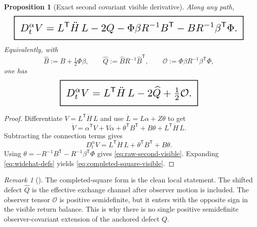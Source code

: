\documentclass[11pt,a4paper]{article}
\numberwithin{equation}{section}
\newcommand{\geomboxed}[1]{%
  \setlength{\fboxsep}{8pt}%
  \setlength{\fboxrule}{0.9pt}%
  \fbox{\scalebox{1.5}{$\displaystyle #1$}}%
}
\theoremstyle{thmcompact}
\newtheorem{proposition}[theorem]{Proposition}
\theoremstyle{remark}
\newtheorem*{remarkplain}{Remark}
\newenvironment{remark}[1][]%
{\begin{remarkbox}\begin{remarkplain}[#1]\normalfont}
{\end{remarkplain}\end{remarkbox}}
\begin{document}
\begin{proposition}[Exact second covariant visible derivative]
\label{prop:exact-second-visible}
Along any path,
\begin{equation}
\geomboxed{
D_t^\alpha V
=
L^{\mathsf T}\ddot H\,L
-
2Q
-
\Phi\beta R^{-1}B^{\mathsf T}
-
BR^{-1}\beta^{\mathsf T}\Phi.
}
\label{eq:raw-second-visible}
\end{equation}
Equivalently, with
\begin{equation}
\widehat B:=B+\tfrac12\Phi\beta,
\qquad
\widehat Q:=\widehat B R^{-1}\widehat B^{\mathsf T},
\qquad
\mathcal O:=\Phi\beta R^{-1}\beta^{\mathsf T}\Phi,
\label{eq:widehat-defs}
\end{equation}
one has
\begin{equation}
\geomboxed{
D_t^\alpha V
=
L^{\mathsf T}\ddot H\,L
-
2\widehat Q
+
\tfrac12\mathcal O.
}
\label{eq:completed-square-visible}
\end{equation}
\end{proposition}

\begin{proof}
Differentiate $V=L^{\mathsf T}\dot H\,L$ and use $\dot L=L\alpha+Z\theta$ to get
\[
\dot V=\alpha^{\mathsf T}V+V\alpha+\theta^{\mathsf T}B^{\mathsf T}+B\theta+L^{\mathsf T}\ddot H\,L.
\]
Subtracting the connection terms gives
\[
D_t^\alpha V=L^{\mathsf T}\ddot H\,L+\theta^{\mathsf T}B^{\mathsf T}+B\theta.
\]
Using $\theta=-R^{-1}B^{\mathsf T}-R^{-1}\beta^{\mathsf T}\Phi$ gives \eqref{eq:raw-second-visible}. Expanding \eqref{eq:widehat-defs} yields \eqref{eq:completed-square-visible}.
\end{proof}

\begin{remark}
The completed-square form is the clean local statement. The shifted defect $\widehat Q$ is the effective exchange channel after observer motion is included. The observer tensor $\mathcal O$ is positive semidefinite, but it enters with the opposite sign in the visible return balance. This is why there is no single positive semidefinite observer-covariant extension of the anchored defect $Q$.
\end{remark}
\end{document}
